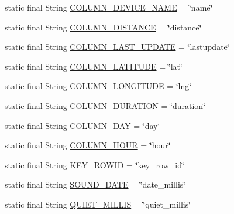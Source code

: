 \begin{DoxyCompactItemize}
\item 
static final String \hyperlink{classcs_1_1usense_1_1db_1_1_usense_s_q_lite_helper_a39dc3cc493eede77dd231fcd4aefaa1f}{C\+O\+L\+U\+M\+N\+\_\+\+D\+E\+V\+I\+C\+E\+\_\+\+N\+A\+M\+E} = \char`\"{}name\char`\"{}
\item 
static final String \hyperlink{classcs_1_1usense_1_1db_1_1_usense_s_q_lite_helper_ad2ede2cc7ae1ff62a7eddbd25f2d29ef}{C\+O\+L\+U\+M\+N\+\_\+\+D\+I\+S\+T\+A\+N\+C\+E} = \char`\"{}distance\char`\"{}
\item 
static final String \hyperlink{classcs_1_1usense_1_1db_1_1_usense_s_q_lite_helper_a9d17bad17d0eb7ff5d8b96859f7506a4}{C\+O\+L\+U\+M\+N\+\_\+\+L\+A\+S\+T\+\_\+\+U\+P\+D\+A\+T\+E} = \char`\"{}lastupdate\char`\"{}
\item 
static final String \hyperlink{classcs_1_1usense_1_1db_1_1_usense_s_q_lite_helper_a6bef6ce9024e0ef2f229932f9cb6f64f}{C\+O\+L\+U\+M\+N\+\_\+\+L\+A\+T\+I\+T\+U\+D\+E} = \char`\"{}lat\char`\"{}
\item 
static final String \hyperlink{classcs_1_1usense_1_1db_1_1_usense_s_q_lite_helper_ace5642feb71d14a4dc5126be700bc79e}{C\+O\+L\+U\+M\+N\+\_\+\+L\+O\+N\+G\+I\+T\+U\+D\+E} = \char`\"{}lng\char`\"{}
\item 
static final String \hyperlink{classcs_1_1usense_1_1db_1_1_usense_s_q_lite_helper_a1672b8f91a7123a6a316e6d6aa77ab77}{C\+O\+L\+U\+M\+N\+\_\+\+D\+U\+R\+A\+T\+I\+O\+N} = \char`\"{}duration\char`\"{}
\item 
static final String \hyperlink{classcs_1_1usense_1_1db_1_1_usense_s_q_lite_helper_a7bdb2b9648dfd58465fa92411a7696a7}{C\+O\+L\+U\+M\+N\+\_\+\+D\+A\+Y} = \char`\"{}day\char`\"{}
\item 
static final String \hyperlink{classcs_1_1usense_1_1db_1_1_usense_s_q_lite_helper_aed53e7e347ec6da1cf3da4921f667895}{C\+O\+L\+U\+M\+N\+\_\+\+H\+O\+U\+R} = \char`\"{}hour\char`\"{}
\item 
static final String \hyperlink{classcs_1_1usense_1_1db_1_1_usense_s_q_lite_helper_a6c668c7ced829f1b1209d9bb67d98687}{K\+E\+Y\+\_\+\+R\+O\+W\+I\+D} = \char`\"{}key\+\_\+row\+\_\+id\char`\"{}
\item 
static final String \hyperlink{classcs_1_1usense_1_1db_1_1_usense_s_q_lite_helper_a6e0ea3be1f3945a94941b7657dce0f49}{S\+O\+U\+N\+D\+\_\+\+D\+A\+T\+E} = \char`\"{}date\+\_\+millis\char`\"{}
\item 
static final String \hyperlink{classcs_1_1usense_1_1db_1_1_usense_s_q_lite_helper_a88e6b2d6e6bf379148ed57a8294b1747}{Q\+U\+I\+E\+T\+\_\+\+M\+I\+L\+L\+I\+S} = \char`\"{}quiet\+\_\+millis\char`\"{}

\end{DoxyCompactItemize}
